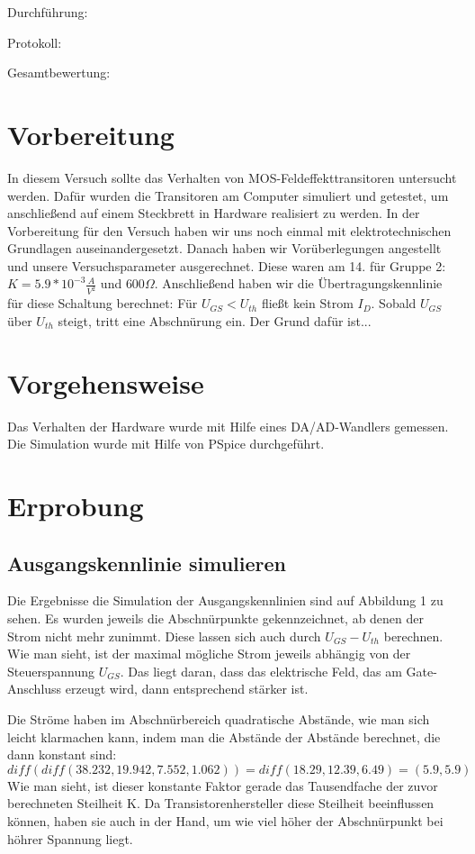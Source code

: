 \documentclass[12pt,a4paper]{scrartcl}
\begin{document}
Durchf\"uhrung:

Protokoll:

Gesamtbewertung:
\clearpage



\section{Vorbereitung}
In diesem Versuch sollte das Verhalten von MOS-Feldeffekttransitoren untersucht werden.
Daf\"ur wurden die Transitoren am Computer simuliert und getestet, um anschlie\ss end auf einem Steckbrett in Hardware realisiert zu werden.
In der Vorbereitung für den Versuch haben wir uns noch einmal mit elektrotechnischen Grundlagen auseinandergesetzt.
Danach haben wir Vor\"uberlegungen angestellt und unsere Versuchsparameter ausgerechnet.
Diese waren am 14. f\"ur Gruppe 2: $ K = 5.9*10^{-3} \frac{A}{V^2} $ und $600 \Omega $.
Anschlie\ss end haben wir die \"Ubertragungskennlinie f\"ur diese Schaltung berechnet:
F\"ur $U_{GS} < U_{th}$ flie\ss t kein Strom $I_D$.
Sobald $U_{GS}$ \"uber $U_{th}$ steigt, tritt eine Abschn\"urung ein.
Der Grund daf\"ur ist...

\section{Vorgehensweise}
Das Verhalten der Hardware wurde mit Hilfe eines DA/AD-Wandlers gemessen.
Die Simulation wurde mit Hilfe von PSpice durchgef\"uhrt.

\section{Erprobung}
\subsection{Ausgangskennlinie simulieren}
Die Ergebnisse die Simulation der Ausgangskennlinien sind auf Abbildung 1 zu sehen.
Es wurden jeweils die Abschn\"urpunkte gekennzeichnet, ab denen der Strom nicht mehr zunimmt.
Diese lassen sich auch durch $U_{GS}-U_{th}$ berechnen.
Wie man sieht, ist der maximal m\"ogliche Strom jeweils abh\"angig von der Steuerspannung $U_{GS}$.
Das liegt daran, dass das elektrische Feld, das am Gate-Anschluss erzeugt wird, dann entsprechend st\"arker ist.

Die Str\"ome haben im Abschn\"urbereich quadratische Abst\"ande, wie man sich leicht klarmachen kann, indem man die Abst\"ande der Abst\"ande berechnet, die dann konstant sind:
$$diff(diff(38.232, 19.942, 7.552, 1.062)) = diff(18.29, 12.39, 6.49) = (5.9, 5.9)$$
Wie man sieht, ist dieser konstante Faktor gerade das Tausendfache der zuvor berechneten Steilheit K.
Da Transistorenhersteller diese Steilheit beeinflussen k\"onnen, haben sie auch in der Hand, um wie viel h\"oher der Abschn\"urpunkt bei h\"ohrer Spannung liegt.
\end{document}
